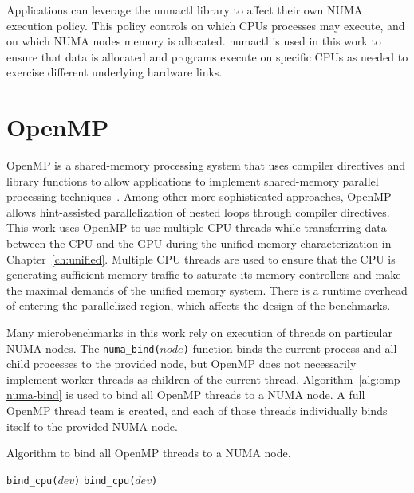 Applications can leverage the numactl\cite{wickman2015numactl} library to affect their own NUMA execution policy.
This policy controls on which CPUs processes may execute, and on which NUMA nodes memory is allocated.
numactl is used in this work to ensure that data is allocated and programs execute on specific CPUs as needed to exercise different underlying hardware links.

\section{OpenMP}
\label{sec:openmp}

OpenMP is a shared-memory processing system that uses compiler directives and library functions to allow applications to implement shared-memory parallel processing techniques~\cite{openmp2013}.
Among other more sophisticated approaches, OpenMP allows hint-assisted parallelization of nested loops through compiler directives.
This work uses OpenMP to use multiple CPU threads while transferring data between the CPU and the GPU during the unified memory characterization in Chapter~\ref{ch:unified}. 
Multiple CPU threads are used to ensure that the CPU is generating sufficient memory traffic to saturate its memory controllers and make the maximal demands of the unified memory system.
There is a runtime overhead of entering the parallelized region, which affects the design of the benchmarks.

Many microbenchmarks in this work rely on execution of threads on particular NUMA nodes.
The \texttt{numa\_bind($node$)} function binds the current process and all child processes to the provided node, but OpenMP does not necessarily implement worker threads as children of the current thread.
Algorithm~\ref{alg:omp-numa-bind} is used to bind all OpenMP threads to a NUMA node.
A full OpenMP thread team is created, and each of those threads individually binds itself to the provided NUMA node.

\begin{algorithm}
	\caption[Bind OpenMP threads to a NUMA node]{
		Algorithm to bind all OpenMP threads to a NUMA node.
	}
	\label{alg:omp-numa-bind}
	\begin{algorithmic}[1]
		\Statex
        \State \texttt{bind\_cpu($dev$)}
        \State \texttt{bind\_cpu($dev$)}
        \EndFor
        \EndFunction
		
	\end{algorithmic}
\end{algorithm}

